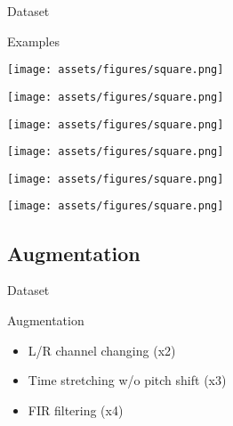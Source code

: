 \begin{frame}{Dataset}
    \begin{block}{Examples}
    \begin{minipage}{.15\textwidth}
        \centering
        \texttt{[image: assets/figures/square.png]}
    \end{minipage}
    \begin{minipage}{.15\textwidth}
        \centering
        \texttt{[image: assets/figures/square.png]}
    \end{minipage}
    \begin{minipage}{.15\textwidth}
        \centering
        \texttt{[image: assets/figures/square.png]}
    \end{minipage}
    \begin{minipage}{.15\textwidth}
        \centering
        \texttt{[image: assets/figures/square.png]}
    \end{minipage}
    \begin{minipage}{.15\textwidth}
        \centering
        \texttt{[image: assets/figures/square.png]}
    \end{minipage}
    \begin{minipage}{.15\textwidth}
        \centering
        \texttt{[image: assets/figures/square.png]}
    \end{minipage}
    \end{block}
\end{frame}

\subsection{Augmentation}
\begin{frame}{Dataset}
    \begin{block}{Augmentation}
        \begin{itemize}
            \item L/R channel changing (x2)
            \item Time stretching w/o pitch shift (x3)
            \item FIR filtering (x4)
        \end{itemize}
    \end{block}
\end{frame}

